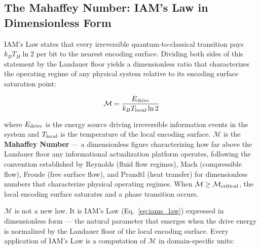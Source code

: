 \documentclass[12pt,a4paper]{article}
\begin{document}
\subsection{The Mahaffey Number: IAM's Law in Dimensionless Form}
\label{sec:mahaffey_number}

IAM's Law states that every irreversible quantum-to-classical transition
pays $k_B T_H \ln 2$ per bit to the nearest encoding surface. Dividing
both sides of this statement by the Landauer floor yields a dimensionless
ratio that characterizes the operating regime of any physical system
relative to its encoding surface saturation point:

\begin{equation}
\mathcal{M} = \frac{E_{\rm drive}}{k_B T_{\rm local} \ln 2}
\label{eq:mahaffey}
\end{equation}

where $E_{\rm drive}$ is the energy source driving irreversible information
events in the system and $T_{\rm local}$ is the temperature of the local
encoding surface. $\mathcal{M}$ is the \textbf{Mahaffey Number} ---
a dimensionless figure characterizing how far above the Landauer floor
any informational actualization platform operates, following the
convention established by Reynolds (fluid flow regimes), Mach
(compressible flow), Froude (free surface flow), and Prandtl (heat
transfer) for dimensionless numbers that characterize physical operating
regimes. When $\mathcal{M} \geq \mathcal{M}_{\rm critical}$, the local
encoding surface saturates and a phase transition occurs.

$\mathcal{M}$ is not a new law. It is IAM's Law
(Eq.~\ref{eq:iams_law}) expressed in dimensionless form --- the natural
parameter that emerges when the drive energy is normalized by the Landauer
floor of the local encoding surface. Every application of IAM's Law
is a computation of $\mathcal{M}$ in domain-specific units:
\end{document}
